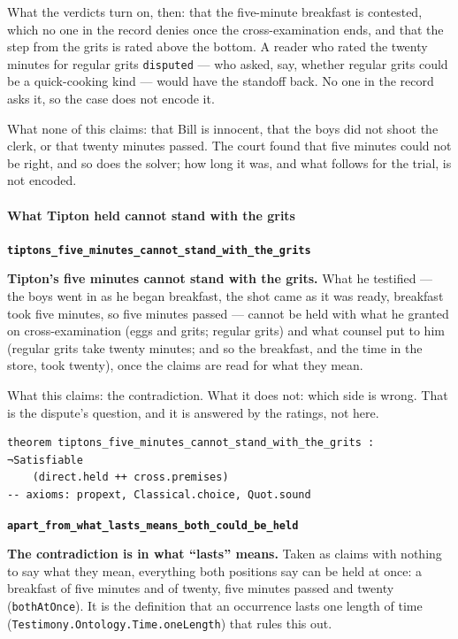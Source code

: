 \documentclass[11pt]{article}
\begin{document}
What the verdicts turn on, then: that the five-minute breakfast is contested, which no one in the record denies once the cross-examination ends, and that the step from the grits is rated above the bottom. A reader who rated the twenty minutes for regular grits \texttt{disputed} — who asked, say, whether regular grits could be a quick-cooking kind — would have the standoff back. No one in the record asks it, so the case does not encode it.

What none of this claims: that Bill is innocent, that the boys did not shoot the clerk, or that twenty minutes passed. The court found that five minutes could not be right, and so does the solver; how long it was, and what follows for the trial, is not encoded.

\paragraph*{What Tipton held cannot stand with the grits}
\leavevmode\par\nobreak
\par\medskip\noindent\textbf{\texttt{tiptons\_\allowbreak{}five\_\allowbreak{}minutes\_\allowbreak{}cannot\_\allowbreak{}stand\_\allowbreak{}with\_\allowbreak{}the\_\allowbreak{}grits}}\par\nobreak\noindent
\textbf{Tipton’s five minutes cannot stand with the grits.} What he testified — the boys went in as he began breakfast, the shot came as it was ready, breakfast took five minutes, so five minutes passed — cannot be held with what he granted on cross-examination (eggs and grits; regular grits) and what counsel put to him (regular grits take twenty minutes; and so the breakfast, and the time in the store, took twenty), once the claims are read for what they mean.

What this claims: the contradiction. What it does not: which side is wrong. That is the dispute’s question, and it is answered by the ratings, not here.

{\small\begin{verbatim}
theorem tiptons_five_minutes_cannot_stand_with_the_grits : ¬Satisfiable
    (direct.held ++ cross.premises)
-- axioms: propext, Classical.choice, Quot.sound
\end{verbatim}}
\par\medskip\noindent\textbf{\texttt{apart\_\allowbreak{}from\_\allowbreak{}what\_\allowbreak{}lasts\_\allowbreak{}means\_\allowbreak{}both\_\allowbreak{}could\_\allowbreak{}be\_\allowbreak{}held}}\par\nobreak\noindent
\textbf{The contradiction is in what “lasts” means.} Taken as claims with nothing to say what they mean, everything both positions say can be held at once: a breakfast of five minutes and of twenty, five minutes passed and twenty (\texttt{both\allowbreak{}At\allowbreak{}Once}). It is the definition that an occurrence lasts one length of time (\texttt{Testimony.Ontology.Time.one\allowbreak{}Length}) that rules this out.
\end{document}
